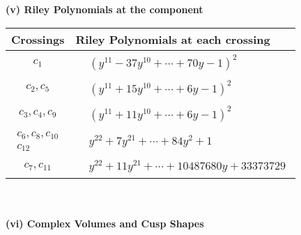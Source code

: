 \documentclass[1p]{elsarticle_modified}
\theoremstyle{definition}
\begin{document}
\newpage\renewcommand{\arraystretch}{1}
\flushleft \textbf{(v) Riley Polynomials at the component}\newline \\
\begin{tabular}{m{50pt}|m{274pt}}
Crossings & \hspace{64pt}Riley Polynomials at each crossing \\
\hline $$\begin{aligned}c_{1}\end{aligned}$$&$\begin{aligned}
&(y^{11}-37 y^{10}+\cdots+70 y-1)^{2}
\end{aligned}$\\
\hline $$\begin{aligned}c_{2},c_{5}\end{aligned}$$&$\begin{aligned}
&(y^{11}+15 y^{10}+\cdots+6 y-1)^{2}
\end{aligned}$\\
\hline $$\begin{aligned}c_{3},c_{4},c_{9}\end{aligned}$$&$\begin{aligned}
&(y^{11}+11 y^{10}+\cdots+6 y-1)^{2}
\end{aligned}$\\
\hline $$\begin{aligned}c_{6},c_{8},c_{10}\\c_{12}\end{aligned}$$&$\begin{aligned}
&y^{22}+7 y^{21}+\cdots+84 y^2+1
\end{aligned}$\\
\hline $$\begin{aligned}c_{7},c_{11}\end{aligned}$$&$\begin{aligned}
&y^{22}+11 y^{21}+\cdots+10487680 y+33373729
\end{aligned}$\\
\hline
\end{tabular}\\~\\
\newpage\flushleft \textbf{(vi) Complex Volumes and Cusp Shapes}
\end{document}
